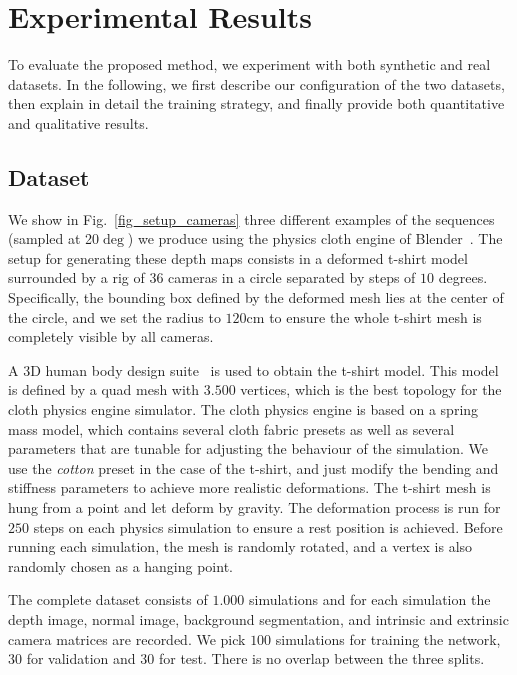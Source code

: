 \section{Experimental Results}
To evaluate the proposed method, we experiment with both synthetic and real datasets. In the following, we first describe our configuration of the two datasets, then explain in detail the training strategy, and finally provide both quantitative and qualitative results.

\subsection{Dataset}

\vspace{1mm}
 We show in Fig.~\ref{fig_setup_cameras} three different examples of the sequences (sampled at 20$\deg$) we produce using the physics cloth engine of Blender~\cite{Blender}. The setup for generating these depth maps consists in a deformed t-shirt model surrounded by a rig of $36$ cameras in a circle separated by steps of $10$ degrees. Specifically, the bounding box defined by the deformed mesh lies at the center of the circle, and we set the radius to $120$cm to ensure the whole t-shirt mesh is completely visible by all cameras.

A 3D human body design suite~\cite{Makehuman} is used to obtain the t-shirt model. This model is defined by a quad mesh with $3.500$ vertices, which is the best topology for the cloth physics engine simulator. The cloth physics engine is based on a spring mass model, which contains several cloth fabric presets as well as several parameters that are tunable for adjusting the behaviour of the simulation. We use the \textit{cotton} preset in the case of the t-shirt, and just modify the bending and stiffness parameters to achieve more realistic deformations. The t-shirt mesh is hung from  a point and let deform by gravity. The deformation process is run for $250$ steps on each physics simulation to ensure a rest position is achieved. Before running each simulation, the mesh is randomly rotated, and a vertex is also randomly chosen as a hanging point. 

The complete dataset consists of $1.000$ simulations and for each simulation  the depth image, normal image, background segmentation, and intrinsic and extrinsic camera matrices are recorded. We pick $100$  simulations for training the network, $30$ for validation and $30$ for test. There is no overlap between the three splits.

